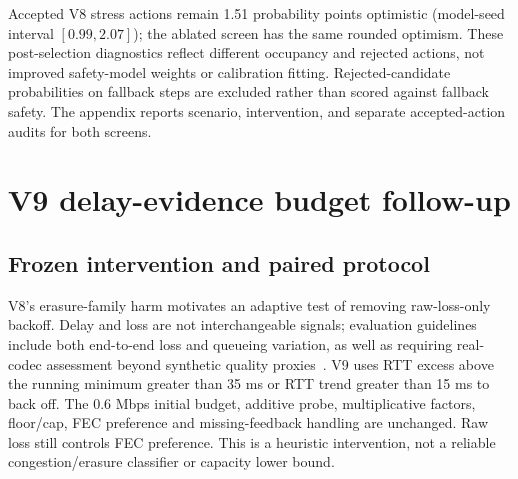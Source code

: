 \documentclass[10pt]{article}
\providecommand{\budgetshieldpath}{generated-budget-shield-v8}
\begin{document}
Accepted V8 stress actions remain 1.51 probability points optimistic (model-seed interval $[0.99,2.07]$); the ablated screen has the same rounded optimism. These post-selection diagnostics reflect different occupancy and rejected actions, not improved safety-model weights or calibration fitting. Rejected-candidate probabilities on fallback steps are excluded rather than scored against fallback safety. The appendix reports scenario, intervention, and separate accepted-action audits for both screens.

\begin{table}[t]
\centering\resizebox{\textwidth}{!}{}
\caption{V8 validation decision against the matched V7 screen. Absolute unsafe frequencies are percentages.}
\label{tab:v8-selection}
\end{table}
\begin{table}[t]
\centering\resizebox{\textwidth}{!}{}
\caption{V8-minus-reference fresh-test contrasts; violation differences are percentage points, with model-seed intervals conditional on the fixed panel. The budget-without-confidence comparator removes only probability/disagreement eligibility.}
\label{tab:v8-contrasts}
\end{table}
\begin{table}[t]
\centering\resizebox{\textwidth}{!}{}
\caption{All V8 fresh-panel controllers. The proposal gate and screens use the same frozen V6-derived bundles; only their inference-time rules differ.}
\label{tab:v8-comparison}
\end{table}

\clearpage
\section{V9 delay-evidence budget follow-up}
\subsection{Frozen intervention and paired protocol}
V8's erasure-family harm motivates an adaptive test of removing raw-loss-only backoff. Delay and loss are not interchangeable signals; evaluation guidelines include both end-to-end loss and queueing variation, as well as requiring real-codec assessment beyond synthetic quality proxies~\cite{rfc8868}. V9 uses RTT excess above the running minimum greater than 35 ms or RTT trend greater than 15 ms to back off. The 0.6 Mbps initial budget, additive probe, multiplicative factors, floor/cap, FEC preference and missing-feedback handling are unchanged. Raw loss still controls FEC preference. This is a heuristic intervention, not a reliable congestion/erasure classifier or capacity lower bound.
\end{document}
